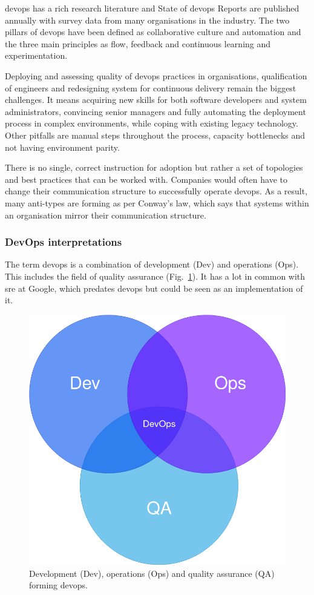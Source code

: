 \documentclass[../main.tex]{subfiles}
\begin{document}
    \gls{devops} has a rich research literature and State of \gls{devops} Reports are published annually with survey data from many organisations in the industry.
    The two pillars of \gls{devops} have been defined as collaborative culture and automation\cite{devops_real_world,devops_surveys} and the three main principles as flow, feedback and continuous learning and experimentation\cite{devops_handbook_1}.

    Deploying and assessing quality of \gls{devops} practices in organisations, qualification of engineers and redesigning system for continuous delivery remain the biggest challenges\cite{devops_surveys}.
    It means acquiring new skills for both software developers and system administrators, convincing senior managers and fully automating the deployment process in complex environments, while coping with existing legacy technology\cite{devops_multicase}.
    Other pitfalls are manual steps throughout the process, capacity bottlenecks and not having environment parity\cite{devops_pitfalls}.

    There is no single, correct instruction for adoption but rather a set of topologies and best practices that can be worked with.
    Companies would often have to change their communication structure to successfully operate \gls{devops}.
    As a result, many anti-types are forming as per Conway's law, which says that systems within an organisation mirror their communication structure.\cite{devops_topologies}

    \subsubsection{DevOps interpretations}
    \label{subsubsec:defs-devops}

    The term \gls{devops} is a combination of development (Dev) and operations (Ops).
    This includes the field of quality assurance (Fig.~\ref{fig:devops_venn}).
    It has a lot in common with \acrlong{sre} at Google, which predates \gls{devops} but could be seen as an implementation of it\cite{sre_google}.

    \begin{figure}[h]
        \centering
        \includegraphics[width=.6\linewidth]{img/def_devops_venn_v3.png}
        \captionsetup{justification=centering}
        \caption{
        Development (Dev), operations (Ops) and quality assurance (QA) forming \gls{devops}.
        }
        \label{fig:devops_venn}
    \end{figure}
\end{document}
